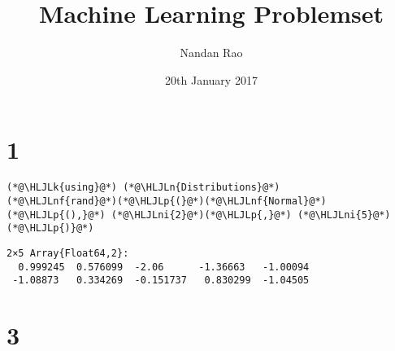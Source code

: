 \documentclass[12pt,a4paper]{article}
\title{ Machine Learning Problemset }
\author{ Nandan Rao }
\date{ 20th January 2017 }
\newcommand{\HLJLk}[1]{\textcolor[RGB]{148,91,176}{\textbf{#1}}}
\newcommand{\HLJLn}[1]{#1}
\newcommand{\HLJLnf}[1]{\textcolor[RGB]{66,102,213}{#1}}
\newcommand{\HLJLni}[1]{\textcolor[RGB]{59,151,46}{#1}}
\newcommand{\HLJLp}[1]{#1}
\begin{document}
\maketitle

\section{1}

\begin{lstlisting}
(*@\HLJLk{using}@*) (*@\HLJLn{Distributions}@*)
(*@\HLJLnf{rand}@*)(*@\HLJLp{(}@*)(*@\HLJLnf{Normal}@*)(*@\HLJLp{(),}@*) (*@\HLJLni{2}@*)(*@\HLJLp{,}@*) (*@\HLJLni{5}@*)(*@\HLJLp{)}@*)
\end{lstlisting}


\begin{lstlisting}
2×5 Array{Float64,2}:
  0.999245  0.576099  -2.06      -1.36663   -1.00094
 -1.08873   0.334269  -0.151737   0.830299  -1.04505
\end{lstlisting}


\section{3}
\end{document}
